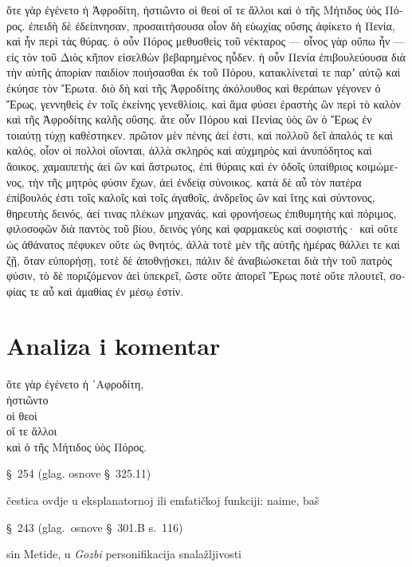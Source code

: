 {\large

\begin{greek}

\noindent ὅτε γὰρ ἐγένετο ἡ Ἀφροδίτη, ἡστιῶντο οἱ θεοὶ οἵ τε ἄλλοι καὶ ὁ τῆς Μήτιδος ὑὸς Πόρος. ἐπειδὴ δὲ ἐδείπνησαν, προσαιτήσουσα οἷον δὴ εὐωχίας οὔσης ἀφίκετο ἡ Πενία, καὶ ἦν περὶ τὰς θύρας. ὁ οὖν Πόρος μεθυσθεὶς τοῦ νέκταρος — οἶνος γὰρ οὔπω ἦν — εἰς τὸν τοῦ Διὸς κῆπον εἰσελθὼν βεβαρημένος ηὗδεν. ἡ οὖν Πενία ἐπιβουλεύουσα διὰ τὴν αὑτῆς ἀπορίαν παιδίον ποιήσασθαι ἐκ τοῦ Πόρου, κατακλίνεταί τε παρʼ αὐτῷ καὶ ἐκύησε τὸν Ἔρωτα. διὸ δὴ καὶ τῆς Ἀφροδίτης ἀκόλουθος καὶ θεράπων γέγονεν ὁ Ἔρως, γεννηθεὶς ἐν τοῖς ἐκείνης γενεθλίοις, καὶ ἅμα φύσει ἐραστὴς ὢν περὶ τὸ καλὸν καὶ τῆς Ἀφροδίτης καλῆς οὔσης. ἅτε οὖν Πόρου καὶ Πενίας ὑὸς ὢν ὁ Ἔρως ἐν τοιαύτῃ τύχῃ καθέστηκεν. πρῶτον μὲν πένης ἀεί ἐστι, καὶ πολλοῦ δεῖ ἁπαλός τε καὶ καλός, οἷον οἱ πολλοὶ οἴονται, ἀλλὰ σκληρὸς καὶ αὐχμηρὸς καὶ ἀνυπόδητος καὶ ἄοικος, χαμαιπετὴς ἀεὶ ὢν καὶ ἄστρωτος, ἐπὶ θύραις καὶ ἐν ὁδοῖς ὑπαίθριος κοιμώμενος, τὴν τῆς μητρὸς φύσιν ἔχων, ἀεὶ ἐνδείᾳ σύνοικος. κατὰ δὲ αὖ τὸν πατέρα ἐπίβουλός ἐστι τοῖς καλοῖς καὶ τοῖς ἀγαθοῖς, ἀνδρεῖος ὢν καὶ ἴτης καὶ σύντονος, θηρευτὴς δεινός, ἀεί τινας πλέκων μηχανάς, καὶ φρονήσεως ἐπιθυμητὴς καὶ πόριμος, φιλοσοφῶν διὰ παντὸς τοῦ βίου, δεινὸς γόης καὶ φαρμακεὺς καὶ σοφιστής· καὶ οὔτε ὡς ἀθάνατος πέφυκεν οὔτε ὡς θνητός, ἀλλὰ τοτὲ μὲν τῆς αὐτῆς ἡμέρας θάλλει τε καὶ ζῇ, ὅταν εὐπορήσῃ, τοτὲ δὲ ἀποθνῄσκει, πάλιν δὲ ἀναβιώσκεται διὰ τὴν τοῦ πατρὸς φύσιν, τὸ δὲ ποριζόμενον ἀεὶ ὑπεκρεῖ, ὥστε οὔτε ἀπορεῖ Ἔρως ποτὲ οὔτε πλουτεῖ, σοφίας τε αὖ καὶ ἀμαθίας ἐν μέσῳ ἐστίν.

\end{greek}

}


\section*{Analiza i komentar}


{\large
\begin{greek}
\noindent ὅτε γὰρ ἐγένετο ἡ ᾿Αφροδίτη, \\
ἡστιῶντο \\
οἱ θεοὶ \\
οἵ τε ἄλλοι \\
καὶ ὁ τῆς Μήτιδος ὑὸς Πόρος.\\

\end{greek}
}

\begin{description}[noitemsep]
\item[ἐγένετο] §~254 (glag. osnove §~325.11)
\item[γὰρ] čestica ovdje u eksplanatornoj ili emfatičkoj funkciji: naime, baš
\item[ἡστιῶντο] §~243 (glag.\ osnove §~301.B s.~116)
\item[Πόρος] sin Metide, u \textit{Gozbi} personifikacija snalažljivosti

\end{description}


